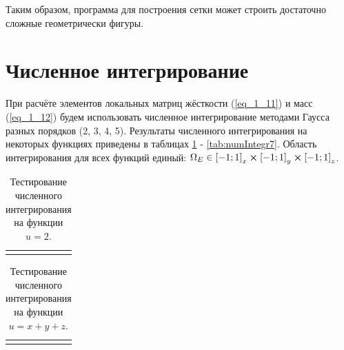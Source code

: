 Таким образом, программа для построения сетки может строить достаточно сложные геометрически фигуры.

\section{Численное интегрирование}

При расчёте элементов локальных матриц жёсткости (\ref{eq_1_11}) и масс (\ref{eq_1_12}) будем использовать численное интегрирование методами Гаусса разных порядков (2, 3, 4, 5). Результаты численного интегрирования на некоторых функциях приведены в таблицах \ref{tab:numIntegr1} - \ref{tab:numIntegr7}. Область интегрирования для всех функций единый: $\Omega_E \in \left[-1; 1\right]_x \cross \left[-1; 1\right]_y \cross \left[-1; 1\right]_z$.

\begin{table}
	\caption{Тестирование численного интегрирования на функции $u = 2$.}
	\centering
	\small
	\begin{tabularx}{1.0\textwidth}{| >{\raggedright\arraybackslash}X | >{\raggedright\arraybackslash}X | >{\raggedright\arraybackslash}X |>{\raggedright\arraybackslash}X |>{\raggedright\arraybackslash}X |}
		\hline
		\centering{Аналитический результат} & \centering{Гаусс 2} & \centering{Гаусс 3} & \centering{Гаусс 4} & \centering{Гаусс 5} \tabularnewline \hline
		
		\centering{16.0} & \centering{1.6000000e+01}& \centering{1.6000000e+01} & \centering{1.6000000e+01} & \centering{1.6000000e+01} \tabularnewline \hline
		
	\end{tabularx}
	\label{tab:numIntegr1}
\end{table}


\begin{table}
	\caption{Тестирование численного интегрирования на функции $u = x + y + z$.}
	\centering
	\small
	\begin{tabularx}{1.0\textwidth}{| >{\raggedright\arraybackslash}X | >{\raggedright\arraybackslash}X | >{\raggedright\arraybackslash}X |>{\raggedright\arraybackslash}X |>{\raggedright\arraybackslash}X |}
		\hline
		\centering{Аналитический результат} & \centering{Гаусс 2} & \centering{Гаусс 3} & \centering{Гаусс 4} & \centering{Гаусс 5} \tabularnewline \hline
		
		\centering{0.0} & \centering{0.0000000e+00}& \centering{-2.2204460e-16} & \centering{5.6898930e-16} & \centering{-6.5225603e-16} \tabularnewline \hline
		
	\end{tabularx}
	\label{tab:numIntegr2}
\end{table}

